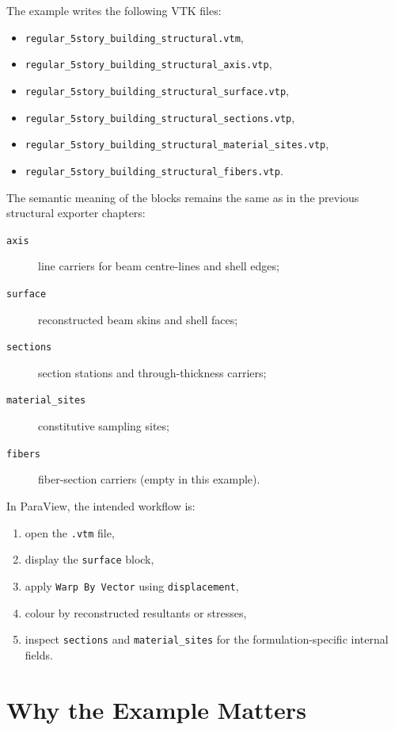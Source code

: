 The example writes the following VTK files:
\begin{itemize}
  \item \texttt{regular\_5story\_building\_structural.vtm},
  \item \texttt{regular\_5story\_building\_structural\_axis.vtp},
  \item \texttt{regular\_5story\_building\_structural\_surface.vtp},
  \item \texttt{regular\_5story\_building\_structural\_sections.vtp},
  \item \texttt{regular\_5story\_building\_structural\_material\_sites.vtp},
  \item \texttt{regular\_5story\_building\_structural\_fibers.vtp}.
\end{itemize}

The semantic meaning of the blocks remains the same as in the previous
structural exporter chapters:
\begin{description}
  \item[\texttt{axis}] line carriers for beam centre-lines and shell edges;
  \item[\texttt{surface}] reconstructed beam skins and shell faces;
  \item[\texttt{sections}] section stations and through-thickness carriers;
  \item[\texttt{material\_sites}] constitutive sampling sites;
  \item[\texttt{fibers}] fiber-section carriers (empty in this example).
\end{description}

In ParaView, the intended workflow is:
\begin{enumerate}
  \item open the \texttt{.vtm} file,
  \item display the \texttt{surface} block,
  \item apply \texttt{Warp By Vector} using \texttt{displacement},
  \item colour by reconstructed resultants or stresses,
  \item inspect \texttt{sections} and \texttt{material\_sites} for the
        formulation-specific internal fields.
\end{enumerate}

\section{Why the Example Matters}

